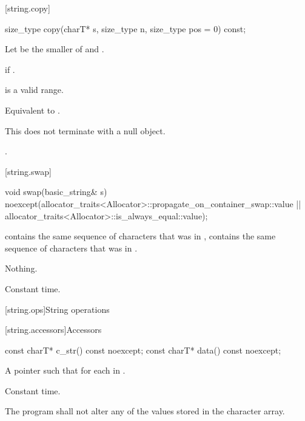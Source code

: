 [string.copy]{}

%
\begin{itemdecl}
size_type copy(charT* s, size_type n, size_type pos = 0) const;
\end{itemdecl}

\begin{itemdescr}
\pnum
Let  be the smaller of  and .

\pnum
\throws
{}
if
.

\pnum
\requires
{} is a valid range.

\pnum
\effects
Equivalent to .
\begin{note} This does not terminate  with a null object. \end{note}

\pnum
\returns
{}.
\end{itemdescr}

[string.swap]{}

%
\begin{itemdecl}
void swap(basic_string& s)
  noexcept(allocator_traits<Allocator>::propagate_on_container_swap::value ||
           allocator_traits<Allocator>::is_always_equal::value);
\end{itemdecl}

\begin{itemdescr}
\pnum
\ensures
{}
contains the same sequence of characters that was in ,
 contains the same sequence of characters that was in
.

\pnum
\throws Nothing.

\pnum
\complexity Constant time.
\end{itemdescr}

[string.ops]{String operations}

[string.accessors]{Accessors}

%
%
\begin{itemdecl}
const charT* c_str() const noexcept;
const charT* data() const noexcept;
\end{itemdecl}

\begin{itemdescr}
\pnum
\returns A pointer  such that  for each
 in .

\pnum
\complexity Constant time.

\pnum
\requires
The program shall not alter any of the values stored in the character array.
\end{itemdescr}

